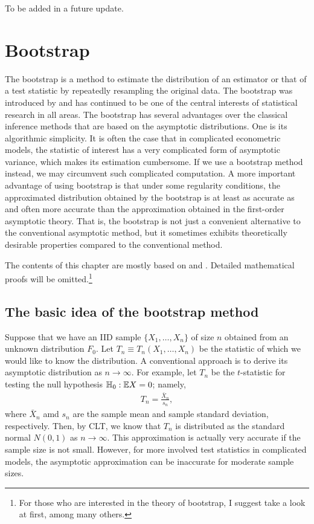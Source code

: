 \documentclass[11pt, A4paper, openany, uplatex]{book}
\begin{document}
To be added in a future update.


\chapter{Bootstrap}

The bootstrap is a method to estimate the distribution of an estimator or that of a test statistic by repeatedly resampling the original data.
The bootstrap was introduced by \cite{efron1979bootstrap} and has continued to be one of the central interests of statistical research in all areas.
The bootstrap has several advantages over the classical inference methods that are based on the asymptotic distributions.
One is its algorithmic simplicity.
It is often the case that in complicated econometric models, the statistic of interest has a very complicated form of asymptotic variance, which makes its estimation cumbersome.
If we use a bootstrap method instead, we may circumvent such complicated computation.
A more important  advantage of using bootstrap is that under some regularity conditions, the approximated distribution obtained by the bootstrap is at least as accurate as and often more accurate than the approximation obtained in the first-order asymptotic theory.
That is, the bootstrap is not just a convenient alternative to the conventional asymptotic method, but it sometimes exhibits theoretically desirable properties compared to the conventional method.

The contents of this chapter are mostly based on \cite{HOROWITZ20013159} and \cite{horowitz2019bootstrap}.
Detailed mathematical proofs will be omitted.\footnote{For those who are interested in the theory of bootstrap, I suggest take a look at \cite{hall1992bootstrap} first, among many others.}

\section{The basic idea of the bootstrap method}

Suppose that we have an IID sample $\{X_1, \ldots, X_n\}$ of size $n$ obtained from an unknown distribution $F_0$.
Let $T_n \equiv T_n(X_1, \ldots, X_n)$ be the statistic of which we would like to know the distribution.
A conventional approach is to derive its asymptotic distribution as $n \to \infty$.
For example, let $T_n$ be the $t$-statistic for testing the null hypothesis $\mathbb{H}_0: \mathbb{E} X = 0$; namely,
\begin{align*}
	T_n = \frac{\bar X_n}{s_n},
\end{align*}
where $\bar X_n$ amd $s_n$ are the sample mean and sample standard deviation, respectively.
Then, by CLT, we know that $T_n$ is distributed as the standard normal $N(0,1)$ as $n \to \infty$.
This approximation is actually very accurate if the sample size is not small.
However, for more involved test statistics in complicated models, the asymptotic approximation can be inaccurate for moderate sample sizes.
\end{document}
